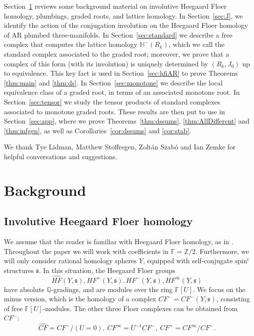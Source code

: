 \documentclass[11 pt]{amsart}
\theoremstyle{remark}
\newcommand\Z{\mathbb{Z}}
\newcommand\Q{\mathbb{Q}}
\def\spinc {{\operatorname{spin^c}}}
\def\s{\mathfrak s}
\def\ff {{\mathbb{F}}}
\def\He{\mathbb{H}}
\def\CF {\mathit{CF}}
\def\HF {\mathit{HF}}
\newcommand\HFhat{\widehat{\HF}}
\newcommand\CFhat{\widehat{\CF}}
\newcommand\HFp {\HF^+}
\newcommand \CFp {\CF^+}
\newcommand \CFm {\CF^-}
\newcommand \HFm {\HF^-}
\newcommand \CFinf {\CF^{\infty}}
\newcommand \HFinf {\HF^{\infty}}
\begin{document}
\medskip
{} Section~\ref{sec:background} reviews some background material on involutive Heegaard Floer homology, plumbings, graded roots, and lattice homology. In Section~\ref{sec:J}, we identify the action of the conjugation involution on the Heegaard Floer homology of AR plumbed three-manifolds. In Section~\ref{sec:standard} we describe a free complex that computes the lattice homology $\He^-(R_k)$, which we call the standard complex associated to the graded root; moreover, we prove that a complex of this form (with its involution) is uniquely determined by $(R_k, J_0)$ up to equivalence. This key fact is used in Section~\ref{sec:hfiAR} to prove Theorems \ref{thm:main} and \ref{thm:ds}. In Section~\ref{sec:monotone} we describe the local equivalence class of a graded root, in terms of an associated monotone root. In Section~\ref{sec:tensor} we study the tensor products of standard complexes associated to monotone graded roots. These results are then put to use in Section~\ref{sec:app}, where we prove Theorems~\ref{thm:dssums}, \ref{thm:AllDifferent} and \ref{thm:infgen}, as well as Corollaries~\ref{cor:dssums} and \ref{cor:stab}.

\medskip
{} We thank Tye Lidman, Matthew Stoffregen, Zolt\'an Szab\'o and Ian Zemke for helpful conversations and suggestions.

\section{Background}
\label{sec:background}

\subsection{Involutive Heegaard Floer homology}
\label{sec:hfi}
We assume that the reader is familiar with Heegaard Floer homology, as in \cite{HolDisk, HolDiskTwo, HolDiskFour, AbsGraded}. Throughout the paper we will work with coefficients in $\ff=\Z/2$. Furthermore, we will only consider rational homology spheres $Y$, equipped with self-conjugate $\spinc$ structures $\s$. In this situation, the Heegaard Floer groups
$$ \HFhat(Y, \s), \HFp(Y, \s), \HFm(Y, \s), \HFinf(Y, \s)$$
have absolute $\Q$-gradings, and are modules over the ring $\ff[U]$. We focus on the minus version, which is the homology of a complex $\CFm=\CFm(Y, \s)$, consisting of free $\ff[U]$-modules. The other three Floer complexes can be obtained from $\CFm$:
\begin{equation}
\label{eq:FromMinus}
 \CFhat = \CFm/(U=0), \  \CFinf = U^{-1}\CFm, \ \CFp = \CFinf/\CFm.
 \end{equation}
\end{document}
